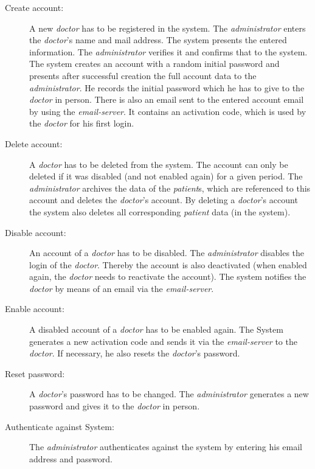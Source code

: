 \documentclass[fontsize=12pt,
               paper=a4,
               twoside=false,
               parskip=half,
               ]{scrartcl}
\begin{document}
\begin{description}

\item[Create account:] A new \emph{doctor} has to be registered in the system. The \emph{administrator} enters the \emph{doctor}'s name and mail address. The system presents the entered information. The \emph{administrator} verifies it and confirms that to the system. The system creates an account with a random initial password and presents after successful creation the full account data to the \emph{administrator}. He records the initial password which he has to give to the \emph{doctor} in person. There is also an email sent to the entered account email by using the \emph{email-server}. It contains an activation code, which is used by the \emph{doctor} for his first login.

\item[Delete account:] A \emph{doctor} has to be deleted from the system. The account can only be deleted if it was disabled (and not enabled again) for a given period. The \emph{administrator} archives the data of the \emph{patient}s, which are referenced to this account and deletes the \emph{doctor}'s account. By deleting a \emph{doctor}'s account the system also deletes all corresponding \emph{patient} data (in the system).

\item[Disable account:] An account of a \emph{doctor} has to be disabled. The \emph{administrator} disables the login of the \emph{doctor}. Thereby the account is also deactivated (when enabled again, the \emph{doctor} needs to reactivate the account). The system notifies the \emph{doctor} by means of an email via the \emph{email-server}. 

\item[Enable account:] A disabled account of a \emph{doctor} has to be enabled again. The System generates a new activation code and sends it via the \emph{email-server} to the \emph{doctor}. If necessary, he also resets the \emph{doctor}'s password.

\item[Reset password:] A \emph{doctor}'s password has to be changed. The \emph{administrator} generates a new password and gives it to the \emph{doctor} in person.

\item[Authenticate against System:] The \emph{administrator} authenticates against the system by entering his email address and password.

\end{description}
\end{document}
